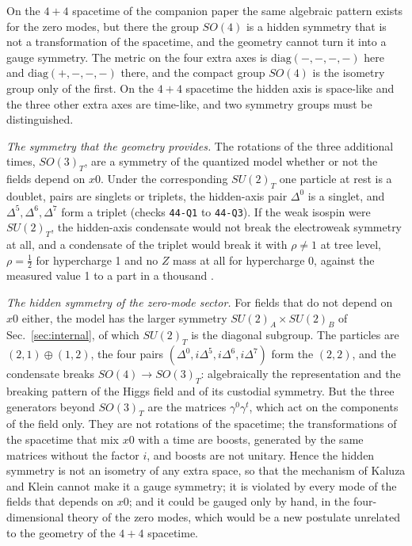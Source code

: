 On the $4+4$ spacetime of the companion paper \cite{Companion1644} the same algebraic pattern exists
for the zero modes, but there the group $SO(4)$ is a hidden symmetry that is not a transformation of
the spacetime, and the geometry cannot turn it into a gauge symmetry. The metric on the four extra
axes is $\mathrm{diag}(-,-,-,-)$ here and $\mathrm{diag}(+,-,-,-)$ there, and the compact group
$SO(4)$ is the isometry group only of the first.
On the $4+4$ spacetime the hidden axis is space-like and the three other extra axes are time-like,
and two symmetry groups must be distinguished.

\emph{The symmetry that the geometry provides.} The rotations of the three additional times,
$SO(3)_T$, are a symmetry of the quantized model whether or not the fields depend on $x0$. Under the
corresponding $SU(2)_T$ one particle at rest is a doublet, pairs are singlets or triplets, the
hidden-axis pair $\Delta^0$ is a singlet, and $\Delta^5,\Delta^6,\Delta^7$ form a triplet (checks
\texttt{44-Q1} to \texttt{44-Q3}). If the weak isospin were $SU(2)_T$, the hidden-axis condensate
would not break the electroweak symmetry at all, and a condensate of the triplet would break it with
$\rho\neq1$ at tree level, $\rho=\tfrac12$ for hypercharge 1 and no $Z$ mass at all for hypercharge
0, against the measured value 1 to a part in a thousand \cite{PDG2024}.

\emph{The hidden symmetry of the zero-mode sector.} For fields that do not depend on $x0$ either, the
model has the larger symmetry $SU(2)_A\times SU(2)_B$ of Sec.~\ref{sec:internal}, of which $SU(2)_T$
is the diagonal subgroup. The particles are $(2,1)\oplus(1,2)$, the four pairs
$(\Delta^0,i\Delta^5,i\Delta^6,i\Delta^7)$ form the $(2,2)$, and the condensate breaks
$SO(4)\to SO(3)_T$: algebraically the representation and the breaking pattern of the Higgs field and
of its custodial symmetry. But the three generators beyond $SO(3)_T$ are the matrices
$\gamma^0\gamma^t$, which act on the components of the field only. They are not rotations of the
spacetime; the transformations of the spacetime that mix $x0$ with a time are boosts, generated by the
same matrices without the factor $i$, and boosts are not unitary. Hence the hidden symmetry is not an
isometry of any extra space, so that the mechanism of Kaluza and Klein \cite{Witten1981} cannot make
it a gauge symmetry; it is violated by every mode of the fields that depends on $x0$; and it could be
gauged only by hand, in the four-dimensional theory of the zero modes, which would be a new postulate
unrelated to the geometry of the $4+4$ spacetime.

